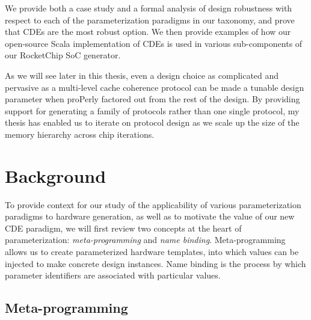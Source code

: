 We provide both a case study and a formal analysis of design robustness with respect to each of the parameterization paradigms in our taxonomy, and prove that CDEs are the most robust option.
We then provide examples of how our open-source Scala implementation of CDEs is used in various sub-components of our RocketChip SoC generator.

As we will see later in this thesis, even a design choice as complicated and pervasive as a multi-level cache coherence protocol can be made a tunable design parameter when proPerly factored out from the rest of the design. 
By providing support for generating a family of protocols rather than one single protocol, my thesis has enabled us to iterate on protocol design as we scale up the size of the memory hierarchy across chip iterations.

\section{Background}
\label{sec:rel}


To provide context for our study of the applicability of various parameterization paradigms to hardware generation,
as well as to motivate the value of our new CDE paradigm,
we will first review two concepts at the heart of parameterization:
\emph{meta-programming} and \emph{name binding}.
Meta-programming allows us to create parameterized hardware templates, into which values can be injected to make concrete design instances.
Name binding is the process by which parameter identifiers are associated with particular values.

\subsection{Meta-programming}

